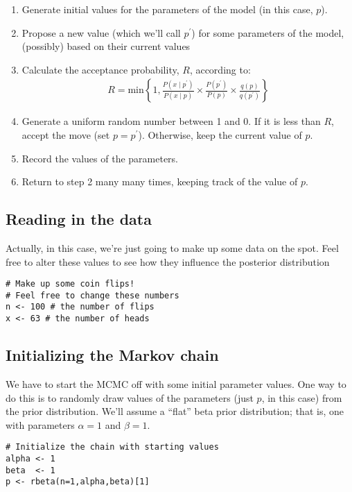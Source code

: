 \begin{enumerate}
	\item Generate initial values for the parameters of the model (in this case, $p$).
	\item Propose a new value (which we'll call $p^\prime$) for some parameters of the model, (possibly) based on their current values 
	\item Calculate the acceptance probability, $R$, according to:
	\begin{align*}
		R = \text{min}\left\{1, \frac{P(x \mid p^\prime)}{P(x \mid p)} \times \frac{P(p^\prime)}{P(p)} \times \frac{q(p)}{q(p^\prime)} \right\}
	\end{align*}
	\item Generate a uniform random number between 1 and 0. If it is less than $R$, accept the move (set $p = p^\prime$). Otherwise, keep the current value of $p$.
	\item Record the values of the parameters.
	\item Return to step 2 many many times, keeping track of the value of $p$.
\end{enumerate}

\subsection{Reading in the data}
Actually, in this case, we're just going to make up some data on the spot.
Feel free to alter these values to see how they influence the posterior distribution
{\tt \begin{snugshade*}
\begin{lstlisting}    
# Make up some coin flips!
# Feel free to change these numbers
n <- 100 # the number of flips
x <- 63	# the number of heads
\end{lstlisting}
\end{snugshade*}}

\subsection{Initializing the Markov chain}
We have to start the MCMC off with some initial parameter values.
One way to do this is to randomly draw values of the parameters (just $p$, in this case) from the prior distribution.
We'll assume a ``flat'' beta prior distribution; that is, one with parameters $\alpha = 1$ and $\beta = 1$.
{\tt \begin{snugshade*}
\begin{lstlisting}
# Initialize the chain with starting values
alpha <- 1
beta  <- 1
p <- rbeta(n=1,alpha,beta)[1]
\end{lstlisting}
\end{snugshade*}}


